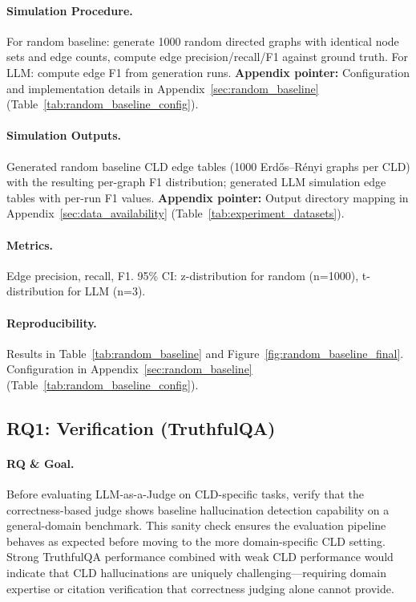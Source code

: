 \paragraph{Simulation Procedure.}
For random baseline: generate 1000 random directed graphs with identical node sets and edge counts, compute edge precision/recall/F1 against ground truth. For LLM: compute edge F1 from generation runs.
\textbf{Appendix pointer:} Configuration and implementation details in Appendix~\ref{sec:random_baseline} (Table~\ref{tab:random_baseline_config}).

\paragraph{Simulation Outputs.}
Generated random baseline CLD edge tables (1000 Erd\H{o}s--R\'enyi graphs per CLD) with the resulting per-graph F1 distribution; generated LLM simulation edge tables with per-run F1 values.
\textbf{Appendix pointer:} Output directory mapping in Appendix~\ref{sec:data_availability} (Table~\ref{tab:experiment_datasets}).

\paragraph{Metrics.}
Edge precision, recall, F1. 95\% CI: z-distribution for random (n=1000), t-distribution for LLM (n=3).

\paragraph{Reproducibility.}
Results in Table~\ref{tab:random_baseline} and Figure~\ref{fig:random_baseline_final}. Configuration in Appendix~\ref{sec:random_baseline} (Table~\ref{tab:random_baseline_config}).

\subsection{RQ1: Verification (TruthfulQA)}
\label{sec:rq1_verification}

\paragraph{RQ \& Goal.}
Before evaluating LLM-as-a-Judge on CLD-specific tasks, verify that the correctness-based judge shows baseline hallucination detection capability on a general-domain benchmark. This sanity check ensures the evaluation pipeline behaves as expected before moving to the more domain-specific CLD setting. Strong TruthfulQA performance combined with weak CLD performance would indicate that CLD hallucinations are uniquely challenging---requiring domain expertise or citation verification that correctness judging alone cannot provide.

